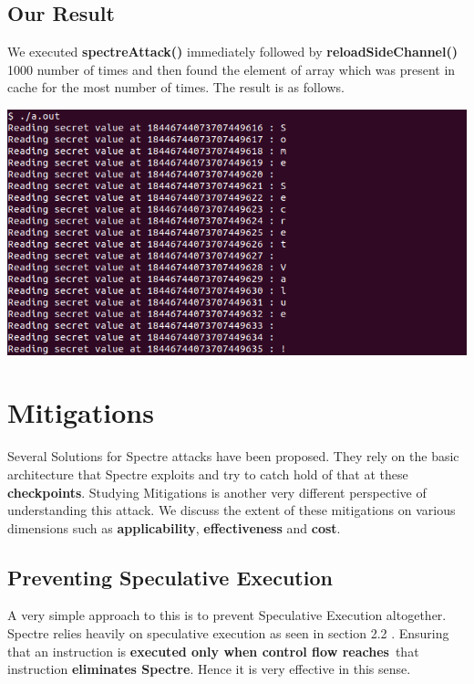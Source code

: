 \documentclass[12pt]{article}
\begin{document}
  
\subsection{Our Result}

We executed \textbf{spectreAttack()} immediately followed by \textbf{reloadSideChannel()} 1000 number of times and then found the element of array which was present in cache for the most number of times. The result is as follows.

\vspace*{0.5 cm}
	{\centering
    \vspace*{0.5 cm}
\includegraphics[scale = 0.6]{spectre.png}\\[1.0 cm]}


\newpage
\section{Mitigations}
Several Solutions for Spectre attacks have been proposed. They rely on the basic architecture that Spectre exploits and try to catch hold of that at these \textbf{checkpoints}. Studying Mitigations is another very different perspective of understanding this attack. We discuss the extent of these mitigations on various dimensions such as \textbf{applicability}, \textbf{effectiveness} and \textbf{cost}.
\subsection{Preventing Speculative Execution}
A very simple approach to this is to prevent Speculative Execution altogether. Spectre relies heavily on speculative execution as seen in section 2.2 . Ensuring that an instruction is \textbf{executed only when control flow reaches}\ that instruction \textbf{eliminates Spectre}. Hence it is very effective in this sense.\\
\end{document}
